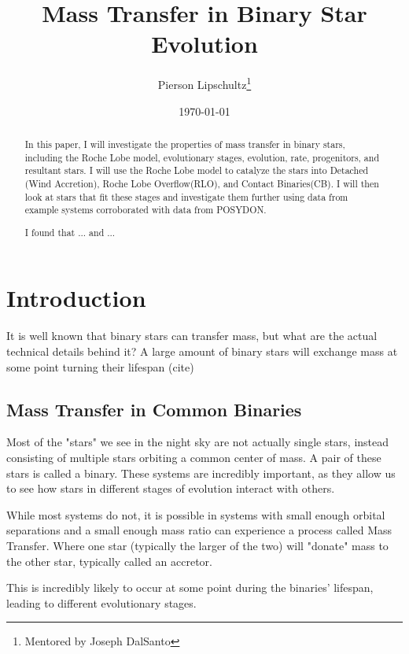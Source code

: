 \documentclass[12pt, letterpaper]{article}
\title{Mass Transfer in Binary Star Evolution}
\author{Pierson Lipschultz\thanks{Mentored by Joseph DalSanto}}
\date{\today}
\begin{document}
\maketitle
\begin{abstract}
    \normalsize
    In this paper, I will investigate the properties of mass transfer in binary stars, including the Roche Lobe model, evolutionary stages, evolution, rate, progenitors, and resultant stars. I will use the Roche Lobe model to catalyze the stars into Detached (Wind Accretion), Roche Lobe Overflow(RLO), and Contact Binaries(CB). I will then look at stars that fit these stages and investigate them further using data from example systems corroborated with data from POSYDON.

    I found that ... and ...
\end{abstract}

\pagebreak

\section{\centering Introduction} %
    It is well known that binary stars can transfer mass, but what are the actual technical details behind it? A large amount of binary stars will exchange mass at some point turning their lifespan (cite)

    \subsection{Mass Transfer in Common Binaries}
    
    
    Most of the "stars" we see in the night sky are not actually single stars, instead consisting of multiple stars orbiting a common center of mass. A pair of these stars is called a binary. These systems are incredibly important, as they allow us to see how stars in different stages of evolution interact with others. 

    While most systems do not, it is possible in systems with small enough orbital separations and a small enough mass ratio can experience a process called Mass Transfer. Where one star (typically the larger of the two) will "donate" mass to the other star, typically called an accretor.

    This is incredibly likely to occur at some point during the binaries' lifespan, leading to different evolutionary stages. 
\end{document}
